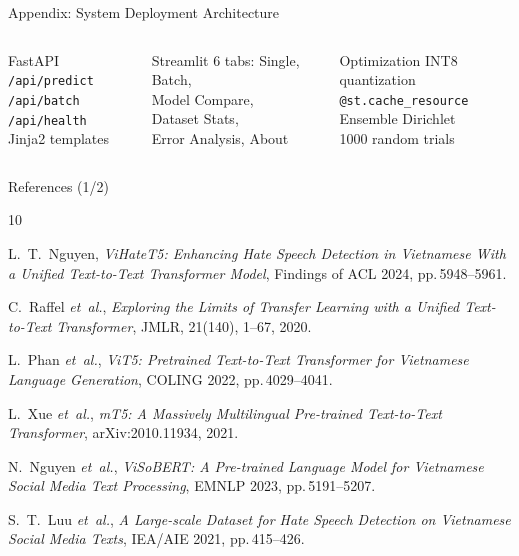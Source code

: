 \documentclass[11pt, aspectratio=169]{beamer}
\begin{document}
\begin{frame}[shrink=8]{Appendix: System Deployment Architecture}
\vspace{0.2cm}
\begin{columns}[T]
  \begin{block}{\centering FastAPI}
    \scriptsize
    \texttt{/api/predict}\\
    \texttt{/api/batch}\\
    \texttt{/api/health}\\
    Jinja2 templates
  \end{block}

  \begin{block}{\centering Streamlit}
    \scriptsize
    6 tabs: Single, Batch,\\
    Model Compare,\\
    Dataset Stats,\\
    Error Analysis, About
  \end{block}

  \begin{block}{\centering Optimization}
    \scriptsize
    INT8 quantization\\
    \texttt{@st.cache\_resource}\\
    Ensemble Dirichlet\\
    1000 random trials
  \end{block}
\end{columns}
\end{frame}

\begin{frame}[shrink=5]{References (1/2)}
\scriptsize
\begin{thebibliography}{10}

L.~T.~Nguyen,
\textit{ViHateT5: Enhancing Hate Speech Detection in Vietnamese With a Unified Text-to-Text Transformer Model},
Findings of ACL 2024, pp.\,5948--5961.

C.~Raffel \emph{et~al.},
\textit{Exploring the Limits of Transfer Learning with a Unified Text-to-Text Transformer},
JMLR, 21(140), 1--67, 2020.

L.~Phan \emph{et~al.},
\textit{ViT5: Pretrained Text-to-Text Transformer for Vietnamese Language Generation},
COLING 2022, pp.\,4029--4041.

L.~Xue \emph{et~al.},
\textit{mT5: A Massively Multilingual Pre-trained Text-to-Text Transformer},
arXiv:2010.11934, 2021.

N.~Nguyen \emph{et~al.},
\textit{ViSoBERT: A Pre-trained Language Model for Vietnamese Social Media Text Processing},
EMNLP 2023, pp.\,5191--5207.

S.~T.~Luu \emph{et~al.},
\textit{A Large-scale Dataset for Hate Speech Detection on Vietnamese Social Media Texts},
IEA/AIE 2021, pp.\,415--426.

\end{thebibliography}
\end{frame}
\end{document}
